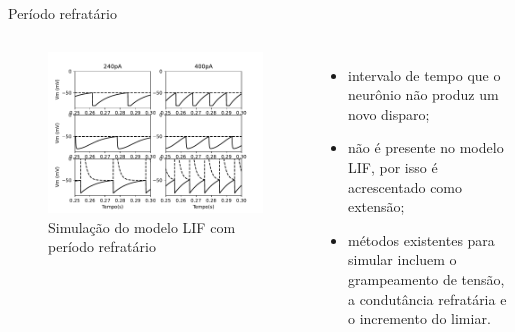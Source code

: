 \begin{frame}{Período refratário}
	\begin{columns}[t]
		\column{5cm}
			\begin{figure}
				\centering
				\caption{Simulação do modelo LIF com período refratário}
				\label{fig:lifrefratario}
				\includegraphics[width=\linewidth]{figs/lif_refratario}
			\end{figure}
		\column{5cm}
		\begin{itemize}
			\item intervalo de tempo que o neurônio não produz um novo disparo;
			\item não é presente no modelo LIF, por isso é acrescentado como extensão;
			\item métodos existentes para simular incluem o grampeamento de tensão, a condutância refratária e o incremento do limiar.
		\end{itemize}
	\end{columns}
\end{frame}

